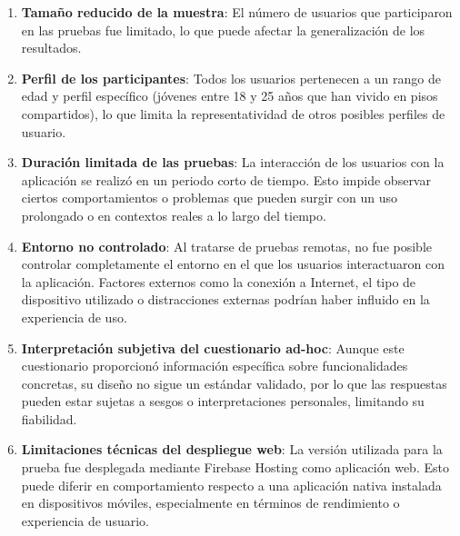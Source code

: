 \begin{enumerate}
\item \textbf{Tamaño reducido de la muestra}: El número de usuarios que participaron en las pruebas fue limitado, lo que puede afectar la generalización de los resultados.

\item \textbf{Perfil de los participantes}: Todos los usuarios pertenecen a un rango de edad y perfil específico (jóvenes entre 18 y 25 años que han vivido en pisos compartidos), lo que limita la representatividad de otros posibles perfiles de usuario.

\item \textbf{Duración limitada de las pruebas}: La interacción de los usuarios con la aplicación se realizó en un periodo corto de tiempo. Esto impide observar ciertos comportamientos o problemas que pueden surgir con un uso prolongado o en contextos reales a lo largo del tiempo.

\item \textbf{Entorno no controlado}: Al tratarse de pruebas remotas, no fue posible controlar completamente el entorno en el que los usuarios interactuaron con la aplicación. Factores externos como la conexión a Internet, el tipo de dispositivo utilizado o distracciones externas podrían haber influido en la experiencia de uso.

\item \textbf{Interpretación subjetiva del cuestionario ad-hoc}: Aunque este cuestionario proporcionó información específica sobre funcionalidades concretas, su diseño no sigue un estándar validado, por lo que las respuestas pueden estar sujetas a sesgos o interpretaciones personales, limitando su fiabilidad.

\item \textbf{Limitaciones técnicas del despliegue web}: La versión utilizada para la prueba fue desplegada mediante Firebase Hosting como aplicación web. Esto puede diferir en comportamiento respecto a una aplicación nativa instalada en dispositivos móviles, especialmente en términos de rendimiento o experiencia de usuario.
\end{enumerate}







